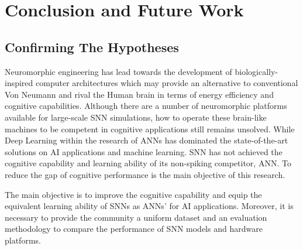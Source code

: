 \chapter{Conclusion and Future Work}
\label{cha:conc}
\section{Confirming The Hypotheses}
Neuromorphic engineering has lead towards the development of biologically-inspired computer architectures which may provide an alternative to conventional Von Neumann and rival the Human brain in terms of energy efficiency and cognitive capabilities.
Although there are a number of neuromorphic platforms available for large-scale SNN simulations, how to operate these brain-like machines to be competent in cognitive applications still remains unsolved.
While Deep Learning within the research of ANNs has dominated the state-of-the-art solutions on AI applications and machine learning.
SNN has not achieved the cognitive capability and learning ability of its non-spiking competitor, ANN.
To reduce the gap of cognitive performance is the main objective of this research.

The main objective is to improve the cognitive capability and equip the equivalent learning ability of SNNs as ANNs' for AI applications.
Moreover, it is necessary to provide the community a uniform dataset and an evaluation methodology to compare the performance of SNN models and hardware platforms.

